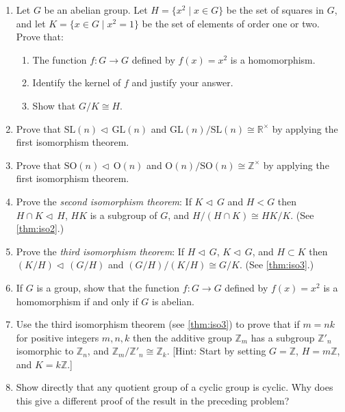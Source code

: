 \documentclass[11pt]{article}
\newenvironment{problems}
{
 \begin{enumerate}[topsep=1pt,itemsep=0pt,parsep=2pt,leftmargin=0.6cm,%
 label={\arabic*.}, ref=\arabic*] \small
}
{
 \end{enumerate}
}
\theoremstyle{definition}
\newcommand{\R}{\mathbb{R}} %
\newcommand{\Z}{\mathbb{Z}} %
\newcommand{\GL}{\mathrm{GL}}
\newcommand{\SL}{\mathrm{SL}}
\renewcommand{\O}{\mathrm{O}}
\newcommand{\SO}{\mathrm{SO}}
\newcommand{\normal}{\triangleleft\,}%
\begin{document}
\begin{problems}
\item Let $G$ be an abelian group. Let $H = \{ x^2 \mid x \in G \}$ be
  the set of squares in $G$, and let $K = \{ x \in G \mid x^2 = 1 \}$
  be the set of elements of order one or two. Prove that:
  \begin{enumerate}
  \item The function $f: G \to G$ defined by $f(x) = x^2$ is a
    homomorphism. 
  \item Identify the kernel of $f$ and justify your answer.
  \item Show that $G/K \cong H$.
  \end{enumerate}

\item Prove that $\SL(n) \normal \GL(n)$ and $\GL(n)/\SL(n) \cong
  \R^\times$ by applying the first isomorphism theorem.

\item Prove that $\SO(n) \normal \O(n)$ and $\O(n)/\SO(n) \cong
  \Z^\times$ by applying the first isomorphism theorem.

\item Prove the {\em second isomorphism theorem}: If $K \normal G$ and
  $H < G$ then $H \cap K \normal H$, $HK$ is a subgroup of $G$, and
  $H/(H\cap K) \cong HK/K$. (See \ref{thm:iso2}.)

\item Prove the {\em third isomorphism theorem}: If $H \normal G$, $K
  \normal G$, and $H \subset K$ then $(K/H) \normal (G/H)$ and
  $(G/H)/(K/H) \cong G/K$.  (See \ref{thm:iso3}.)

\item If $G$ is a group, show that the function $f: G \to G$ defined
  by $f(x) = x^2$ is a homomorphism if and only if $G$ is abelian.


\item Use the third isomorphism theorem (see \ref{thm:iso3}) to prove
  that if $m = nk$ for positive integers $m,n,k$ then the additive
  group $\Z_m$ has a subgroup $\Z'_n$ isomorphic to $\Z_n$, and
  $\Z_m/\Z'_n \cong \Z_k$. [Hint: Start by setting $G = \Z$, $H =
    m\Z$, and $K=k\Z$.]

\item Show directly that any quotient group of a cyclic group is
  cyclic. Why does this give a different proof of the result in the
  preceding problem?

\end{problems}
\end{document}
